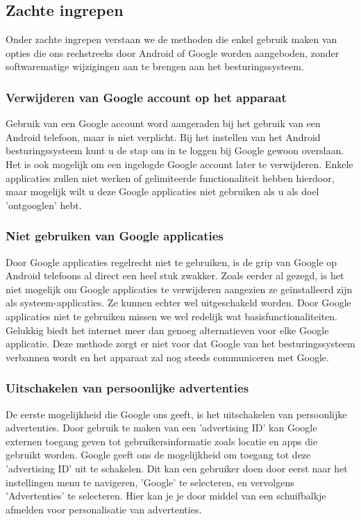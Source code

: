 \subsection{Zachte ingrepen}

Onder zachte ingrepen verstaan we de methoden die enkel gebruik maken van opties die ons rechstreeks door Android of Google worden aangeboden, zonder softwarematige wijzigingen aan te brengen aan het besturingssysteem.

\subsubsection{Verwijderen van Google account op het apparaat}

Gebruik van een Google account word aangeraden bij het gebruik van een Android telefoon, maar is niet verplicht. Bij het instellen van het Android besturingssysteem kunt u de stap om in te loggen bij Google gewoon overslaan. Het is ook mogelijk om een ingelogde Google account later te verwijderen. Enkele applicaties zullen niet werken of gelimiteerde functionaliteit hebben hierdoor, maar mogelijk wilt u deze Google applicaties niet gebruiken als u als doel 'ontgooglen' hebt.

\subsubsection{Niet gebruiken van Google applicaties}
Door Google applicaties regelrecht niet te gebruiken, is de grip van Google op Android telefoons al direct een heel stuk zwakker.
Zoals eerder al gezegd, is het niet mogelijk om Google applicaties te verwijderen aangezien ze geïnstalleerd zijn als systeem-applicaties. Ze kunnen echter wel uitgeschakeld worden. Door Google applicaties niet te gebruiken missen we wel redelijk wat basisfunctionaliteiten. Gelukkig biedt het internet meer dan genoeg alternatieven voor elke Google applicatie. Deze methode zorgt er niet voor dat Google van het besturingssysteem verbannen wordt en het apparaat zal nog steeds communiceren met Google.

\subsubsection{Uitschakelen van persoonlijke advertenties}
De eerste mogelijkheid die Google ons geeft, is het uitschakelen van persoonlijke advertenties. Door gebruik te maken van een 'advertising ID' kan Google externen toegang geven tot gebruikersinformatie zoals locatie en apps die gebruikt worden. Google geeft ons de mogelijkheid om toegang tot deze 'advertising ID' uit te schakelen. Dit kan een gebruiker doen door eerst naar het instellingen menu te navigeren, 'Google' te selecteren, en vervolgens 'Advertenties' te selecteren. Hier kan je je door middel van een schuifbalkje afmelden voor personalisatie van advertenties. \autocite{knight_degoogle}

